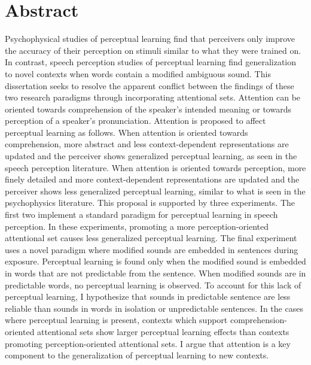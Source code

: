 
\chapter{Abstract}

Psychophysical studies of perceptual learning find that perceivers only improve the accuracy of their perception on stimuli similar to what they were trained on.
In contrast, speech perception studies of perceptual learning find generalization to novel contexts when words contain a modified ambiguous sound.
This dissertation seeks to resolve the apparent conflict between the findings of these two research paradigms through incorporating attentional sets.
Attention can be oriented towards comprehension of the speaker's intended meaning or towards perception of a speaker's pronunciation.
Attention is proposed to affect perceptual learning as follows.
When attention is oriented towards comprehension, more abstract and less context-dependent representations are updated and the perceiver shows generalized perceptual learning, as seen in the speech perception literature.
When attention is oriented towards perception, more finely detailed and more context-dependent representations are updated and the perceiver shows less generalized perceptual learning, similar to what is seen in the psychophysics literature.
This proposal is supported by three experiments.
The first two implement a standard paradigm for perceptual learning in speech perception.
In these experiments, promoting a more perception-oriented attentional set causes less generalized perceptual learning.
The final experiment uses a novel paradigm where modified sounds are embedded in sentences during exposure.
Perceptual learning is found only when the modified sound is embedded in words that are not predictable from the sentence.
When modified sounds are in predictable words, no perceptual learning is observed.
To account for this lack of perceptual learning, I hypothesize that sounds in predictable sentence are less reliable than sounds in words in isolation or unpredictable sentences.
In the cases where perceptual learning is present, contexts which support comprehension-oriented attentional sets show larger perceptual learning effects than contexts promoting perception-oriented attentional sets.
I argue that attention is a key component to the generalization of perceptual learning to new contexts.


